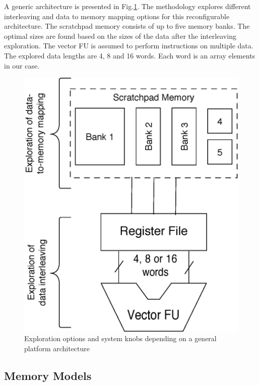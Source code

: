 \documentclass[prodmode,acmtodaes]{acmsmall}
\begin{document}
A generic architecture is presented in Fig.\ref{fig:arch}.
The methodology explores different interleaving and data to memory mapping options for this reconfigurable architecture.
The scratchpad memory consists of up to five memory banks. 
The optimal sizes are found based on the sizes of the data after the interleaving exploration.
The vector FU is assumed to perform instructions on multiple data.
The explored data lengths are 4, 8 and 16 words.
Each word is an array elements in our case. 

\begin{figure}
\centering
	\caption{Exploration options and system knobs depending on a general platform architecture}
	\label{fig:arch}
	\includegraphics[scale = 0.5]{Images/Architecture.eps} 
\end{figure}

\subsection{Memory Models}
\end{document}
